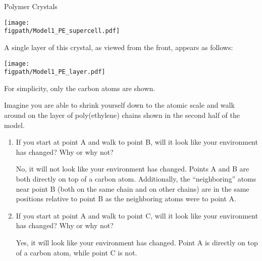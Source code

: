 \begin{activity}{Polymer Crystals}
\begin{model}
	\vspace{6pt}
	\centerline{\texttt{[image: \\figpath/Model1\_PE\_supercell.pdf]}}	
	
	
	A single layer of this crystal, as viewed from the front, appears as follows:
	
	\vspace{6pt}
	\centerline{\texttt{[image: \\figpath/Model1\_PE\_layer.pdf]}}	
	
	For simplicity, only the carbon atoms are shown.
	
\end{model}


\begin{ctqs}

	\question Imagine you are able to shrink yourself down to the atomic scale and walk around on the layer of poly(ethylene) chains shown in the second half of the model.
	
		\begin{enumerate}
			\item If you start at point A and walk to point B, will it look like your environment has changed?  Why or why not?
	
		\begin{solution}[0.75in]{}
			No, it will not look like your environment has changed.  Points A and B are both directly on top of a carbon atom.  Additionally, the ``neighboring'' atoms near point B (both on the same chain and on other chains) are in the same positions relative to point B as the neighboring atoms were to point A.
		\end{solution}
			
			\item If you start at point A and walk to point C, will it look like your environment has changed?  Why or why not?
	
		\begin{solution}[0.75in]{}
			Yes, it will look like your environment has changed.  Point A is directly on top of a carbon atom, while point C is not.
		\end{solution}
			
		\end{enumerate}
		

\end{ctqs}
\end{activity}
